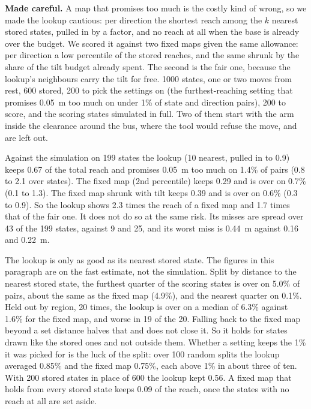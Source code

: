 \documentclass[pdflatex,sn-mathphys-num]{sn-jnl}
\begin{document}
\textbf{Made careful.} A map that promises too much is the costly kind of wrong, so we made the lookup cautious: per
direction the shortest reach among the $k$ nearest stored states, pulled in by a factor, and no reach at all when
the base is already over the budget. We scored it against two fixed maps given the same allowance: per direction a
low percentile of the stored reaches, and the same shrunk by the share of the tilt budget already spent. The second
is the fair one, because the lookup's neighbours carry the tilt for free. 1000 states, one or two moves from rest,
600 stored, 200 to pick the settings on (the furthest-reaching setting that promises 0.05~m too much on under 1\% of
state and direction pairs), 200 to score, and the scoring states simulated in full. Two of them start with the arm
inside the clearance around the bus, where the tool would refuse the move, and are left out.

Against the simulation on 199 states the lookup (10 nearest, pulled in to 0.9) keeps 0.67 of the total reach and
promises 0.05~m too much on 1.4\% of pairs (0.8 to 2.1 over states). The fixed map (2nd percentile) keeps 0.29 and
is over on 0.7\% (0.1 to 1.3). The fixed map shrunk with tilt keeps 0.39 and is over on 0.6\% (0.3 to 0.9). So the
lookup shows 2.3 times the reach of a fixed map and 1.7 times that of the fair one. It does not do so at the same
risk. Its misses are spread over 43 of the 199 states, against 9 and 25, and its worst miss is 0.44~m against 0.16
and 0.22~m.

The lookup is only as good as its nearest stored state. The figures in this paragraph are on the fast estimate, not
the simulation. Split by distance to the nearest stored state, the furthest quarter of the scoring states is over on
5.0\% of pairs, about the same as the fixed map (4.9\%), and the nearest quarter on 0.1\%. Held out by region, 20
times, the lookup is over on a median of 6.3\% against 1.6\% for the fixed map, and worse in 19 of the 20. Falling
back to the fixed map beyond a set distance halves that and does not close it. So it holds for states drawn like the
stored ones and not outside them. Whether a setting keeps the 1\% it was picked for is the luck of the split: over
100 random splits the lookup averaged 0.85\% and the fixed map 0.75\%, each above 1\% in about three of ten. With
200 stored states in place of 600 the lookup kept 0.56. A fixed map that holds from every stored state keeps 0.09 of
the reach, once the states with no reach at all are set aside. %
\end{document}
